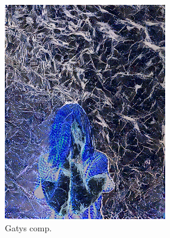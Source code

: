 \begin{figure}[]
\begin{subfigure}{\textwidth}
\begin{subfigure}{0.24\textwidth}
            \includegraphics[width=\textwidth]{images/04-experiment02/human/marble/gatys_im.jpg}
            \caption*{Gatys comp.}
        \end{subfigure}
        \hfill
        \begin{subfigure}{0.24\textwidth}
            \centering

\end{subfigure}
\end{subfigure}
\end{figure}
